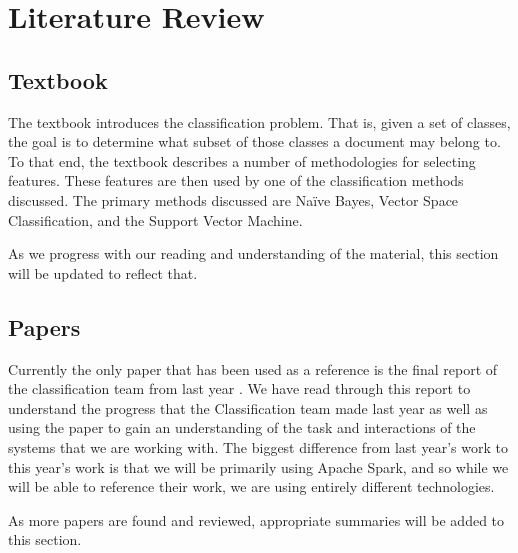 \chapter{Literature Review}\label{ch:literatureReview}

\section{Textbook}
The textbook \cite{manning2008introduction} introduces the classification problem. That is, given a set of classes, the goal is to determine what subset of those classes a document may belong to. To that end, the textbook describes a number of methodologies for selecting features. These features are then used by one of the classification methods discussed. The primary methods discussed are Na\"{i}ve Bayes, Vector Space Classification, and the Support Vector Machine.

As we progress with our reading and understanding of the material, this section will be updated to reflect that.

\section{Papers}
Currently the only paper that has been used as a reference is the final report of the classification team from last year \cite{cui2015classification}. We have read through this report to understand the progress that the Classification team made last year as well as using the paper to gain an understanding of the task and interactions of the systems that we are working with. The biggest difference from last year's work to this year's work is that we will be primarily using Apache Spark, and so while we will be able to reference their work, we are using entirely different technologies.

As more papers are found and reviewed, appropriate summaries will be added to this section.
